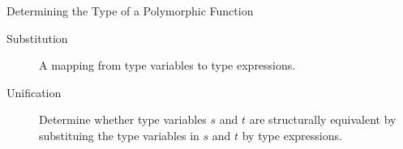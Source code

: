\begin{bibunit}[apalike]
\begin{frame}{Determining the Type of a Polymorphic Function}
	\vspace{1em}
	\begin{description}
	\item[Substitution] A mapping from type variables to type expressions. 
	\item[Unification] Determine whether type variables $s$ and $t$ are structurally equivalent by substituing the type variables in $s$ and $t$ by type expressions.
	\end{description}
\end{frame}


\end{bibunit}
